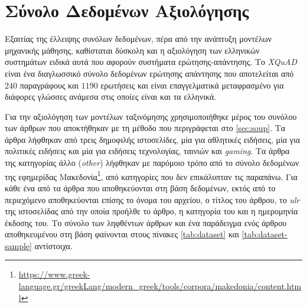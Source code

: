 \section{Σύνολο Δεδομένων Αξιολόγησης}
\label{sec:eval-dataset}
Εξαιτίας της έλλειψης συνόλων δεδομένων, πέρα από την ανάπτυξη μοντέλων μηχανικής μάθησης, καθίσταται δύσκολη και η αξιολόγηση των ελληνικών συστημάτων ειδικά αυτά που αφορούν συστήματα ερώτησης-απάντησης. Το \emph{XQuAD} \cite{xquad} είναι ένα διαγλωσσικό σύνολο δεδομένων ερώτησης απάντησης που αποτελείται από $240$ παραγράφους και $1190$ ερωτήσεις και είναι επαγγελματικά μεταφρασμένο για διάφορες γλώσσες ανάμεσα στις οποίες είναι και τα ελληνικά.

Για την αξιολόγηση των μοντέλων ταξινόμησης χρησιμοποιήθηκε μέρος του συνόλου των άρθρων που αποκτήθηκαν με τη μέθοδο που περιγράφεται στο \autoref{sec:soup}. Τα άρθρα λήφθηκαν από τρεις δημοφιλής ιστοσελίδες, μία για αθλητικές ειδήσεις, μία για πολιτικές ειδήσεις και μία για ειδήσεις τεχνολογίας, ταινιών και \emph{gaming}. Τα άρθρα της κατηγορίας άλλο (\emph{other}) λήφθηκαν με παρόμοιο τρόπο από το σύνολο δεδομένων της εφημερίδας Μακεδονία\footnote{\url{https://www.greek-language.gr/greekLang/modern_greek/tools/corpora/makedonia/content.html}}, από κατηγορίες που δεν επικάλυπταν τις παραπάνω. Για κάθε ένα από τα άρθρα που αποθηκεύονται στη βάση δεδομένων, εκτός από το περιεχόμενο αποθηκεύονται επίσης το όνομα του αρχείου, ο τίτλος του άρθρου, το \emph{ulr} της ιστοσελίδας από την οποία προήλθε το άρθρο, η κατηγορία του και η ημερομηνία έκδοσης του. Το σύνολο των ληφθέντων άρθρων και ένα παράδειγμα ενός άρθρου αποθηκευμένου στη βάση φαίνονται στους πίνακες \ref{tab:dataset} και \ref{tab:dataset-sample} αντίστοιχα.



